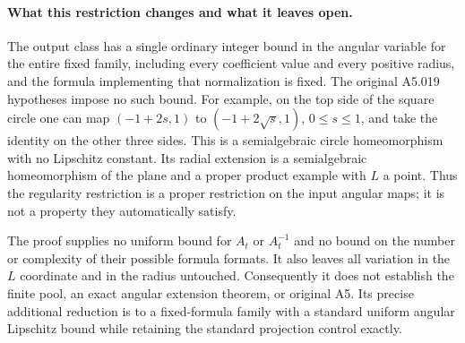 \paragraph{What this restriction changes and what it leaves open.}
The output class has a single ordinary integer bound in the angular
variable for the entire fixed family, including every coefficient
value and every positive radius, and the formula implementing that
normalization is fixed. The original A5.019 hypotheses impose no such
bound. For example, on the top side of the square circle one can map
$(-1+2s,1)$ to $(-1+2\sqrt{s},1)$, $0\le s\le1$, and take the identity
on the other three sides. This is a semialgebraic circle homeomorphism
with no Lipschitz constant. Its radial extension is a semialgebraic
homeomorphism of the plane and a proper product example with $L$ a
point. Thus the regularity restriction is a proper restriction on the
input angular maps; it is not a property they automatically satisfy.

The proof supplies no uniform bound for $A_t$ or $A_t^{-1}$ and no
bound on the number or complexity of their possible formula formats.
It also leaves all variation in the $L$ coordinate and in the radius
untouched. Consequently it does not establish the finite pool, an exact
angular extension theorem, or original A5. Its precise additional
reduction is to a fixed-formula family with a standard uniform angular
Lipschitz bound while retaining the standard projection control exactly.
